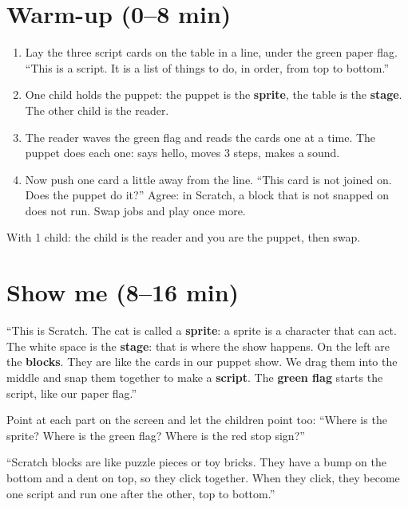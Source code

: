 \section{Warm-up (0--8 min)}
\begin{unplugged}
\begin{enumerate}[leftmargin=1.4em,itemsep=1pt]
  \item Lay the three script cards on the table in a line, under the green paper flag. \enquote{This is a script. It is a list of things to do, in order, from top to bottom.}
  \item One child holds the puppet: the puppet is the \textbf{sprite}, the table is the \textbf{stage}. The other child is the reader.
  \item The reader waves the green flag and reads the cards one at a time. The puppet does each one: says hello, moves 3 steps, makes a sound.
  \item Now push one card a little away from the line. \enquote{This card is not joined on. Does the puppet do it?} Agree: in Scratch, a block that is not snapped on does not run. Swap jobs and play once more.
\end{enumerate}
With 1 child: the child is the reader and you are the puppet, then swap.
\end{unplugged}

\section{Show me (8--16 min)}
\begin{teacherscript}
\enquote{This is Scratch. The cat is called a \textbf{sprite}: a sprite is a character that can act. The white space is the \textbf{stage}: that is where the show happens. On the left are the \textbf{blocks}. They are like the cards in our puppet show. We drag them into the middle and snap them together to make a \textbf{script}. The \textbf{green flag} starts the script, like our paper flag.}

Point at each part on the screen and let the children point too: \enquote{Where is the sprite? Where is the green flag? Where is the red stop sign?}
\end{teacherscript}

\begin{analogy}
\enquote{Scratch blocks are like puzzle pieces or toy bricks. They have a bump on the bottom and a dent on top, so they click together. When they click, they become one script and run one after the other, top to bottom.}
\end{analogy}

